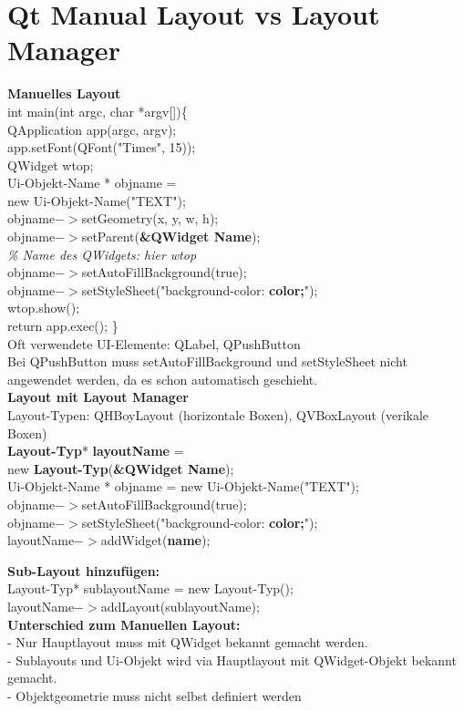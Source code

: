 

\section{Qt Manual Layout vs Layout Manager}
\begin{multicols}{2}
\textbf{Manuelles Layout} \\
int main(int argc, char *argv[])\{ \\
QApplication app(argc, argv); \\
app.setFont(QFont("Times", 15)); \\
QWidget wtop; \\
Ui-Objekt-Name * objname = \\
new Ui-Objekt-Name("TEXT"); \\
objname$->$setGeometry(x, y, w, h); \\
objname$->$setParent(\textbf{\&QWidget Name}); \\
\textit{\% Name des QWidgets: hier wtop}\\
objname$->$setAutoFillBackground(true); \\
objname$->$setStyleSheet("background-color: \textbf{color;}"); \\
wtop.show(); \\
return app.exec(); \}\\

Oft verwendete UI-Elemente: QLabel, QPushButton  \\
Bei QPushButton muss setAutoFillBackground und setStyleSheet nicht angewendet werden, da es schon automatisch geschieht.
\columnbreak \\
\textbf{Layout mit Layout Manager} \\
Layout-Typen: QHBoyLayout (horizontale Boxen), QVBoxLayout (verikale Boxen) \\
\textbf{Layout-Typ}* \textbf{layoutName} = \\
new \textbf{Layout-Typ}(\textbf{\&QWidget Name}); \\
Ui-Objekt-Name * objname = new Ui-Objekt-Name("TEXT"); \\
objname$->$setAutoFillBackground(true); \\
objname$->$setStyleSheet("background-color: \textbf{color;}"); \\
layoutName$->$addWidget(\textbf{name});

\textbf{Sub-Layout hinzufügen:} \\
Layout-Typ* sublayoutName = new Layout-Typ(); \\
layoutName$->$addLayout(sublayoutName); \\

\textbf{Unterschied zum Manuellen Layout:} \\
- Nur Hauptlayout muss mit QWidget bekannt gemacht werden. \\
- Sublayouts und Ui-Objekt wird via Hauptlayout mit QWidget-Objekt bekannt gemacht. \\
- Objektgeometrie muss nicht selbst definiert werden \\
\end{multicols}
